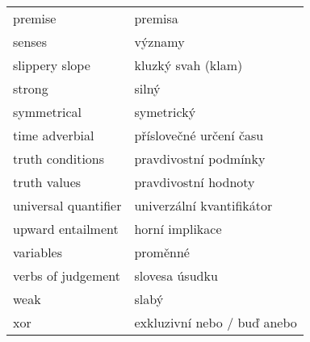 \documentclass[a4paper,landscape,headrule,footrule,xetex]{foils}
\begin{document}
\begin{longtable}{ll}
premise & premisa \\
senses & významy \\
slippery slope & kluzký svah (klam) \\
strong & silný \\
symmetrical & symetrický \\
time adverbial & příslovečné určení času \\
truth conditions & pravdivostní podmínky \\
truth values & pravdivostní hodnoty \\
universal quantifier & univerzální kvantifikátor \\
upward entailment & horní implikace \\
variables & proměnné \\
verbs of judgement & slovesa úsudku \\
weak & slabý \\
xor & exkluzivní nebo / buď anebo \\
\end{longtable}


\end{document}
